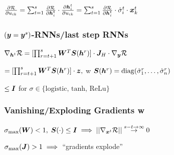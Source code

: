 $\frac{\partial\mathcal{R}}{\partial u_{ik}}=\sum^s_{t=1} \frac{\partial\mathcal{R}}{\partial \boldsymbol{h}^t_i}\cdot \frac{\partial\boldsymbol{h}^t_i}{\partial u_{ik}}=\sum^s_{t=1} \frac{\partial\mathcal{R}}{\partial \boldsymbol{h}^t_i}\cdot \dot{\sigma}_i^t \cdot \boldsymbol{x}^{t}_k$

\subsubsection*{$(\boldsymbol{y}=\boldsymbol{y}^s)$-RNNs/last step RNNs}

$\nabla_{\boldsymbol{h}^t} \mathcal{R} =[\prod^s_{r=t+1}\boldsymbol{W}^T \boldsymbol{S}(\boldsymbol{h}^r)]\cdot\boldsymbol{J}_H\cdot\nabla_{\boldsymbol{y}}\mathcal{R}$

$=[\prod^s_{r=t+1}\boldsymbol{W}^T \boldsymbol{S}(\boldsymbol{h}^r)]\cdot\boldsymbol{z},$
w $\boldsymbol{S}(\boldsymbol{h}^r)=\operatorname*{diag} (\dot{\sigma}^r_1,\dots,\dot{\sigma}^r_n)$

$\leq \boldsymbol{I}$ for $\sigma\in\{\text{logistic, tanh, ReLu}\}$
\subsubsection*{Vanishing/Exploding Gradients w }
$\sigma_{\max}(\boldsymbol{W})<1,\; \boldsymbol{S}(\cdot)\leq \boldsymbol{I}\implies ||\nabla_{\boldsymbol{x}^t}\mathcal{R}||\stackrel{s-t\rightarrow \infty}{\rightarrow}0$

$\sigma_{\max}(\boldsymbol{J})>1 \implies$ ``gradients explode''


